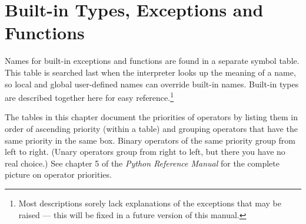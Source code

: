 \chapter{Built-in Types, Exceptions and Functions}
\label{builtin}

Names for built-in exceptions and functions are found in a separate
symbol table.  This table is searched last when the interpreter looks
up the meaning of a name, so local and global
user-defined names can override built-in names.  Built-in types are
described together here for easy reference.\footnote{
	Most descriptions sorely lack explanations of the exceptions
	that may be raised --- this will be fixed in a future version of
	this manual.}

The tables in this chapter document the priorities of operators by
listing them in order of ascending priority (within a table) and
grouping operators that have the same priority in the same box.
Binary operators of the same priority group from left to right.
(Unary operators group from right to left, but there you have no real
choice.)  See chapter 5 of the \emph{Python Reference Manual} for the
complete picture on operator priorities.
